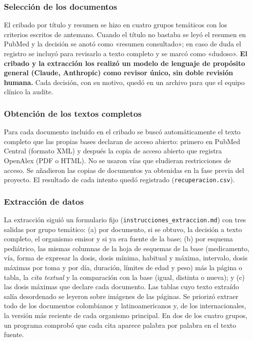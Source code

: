 \documentclass[11pt,a4paper]{article}
\newcommand{\codigo}[1]{\texttt{\small #1}}
\begin{document}
\subsubsection{Selección de los documentos}

El cribado por título y resumen se hizo en cuatro grupos temáticos con los criterios escritos de antemano. Cuando el título no bastaba se leyó el resumen en PubMed y la decisión se anotó como «resumen consultado»; en caso de duda el registro se incluyó para revisarlo a texto completo y se marcó como «dudoso». \textbf{El cribado y la extracción los realizó un modelo de lenguaje de propósito general (Claude, Anthropic) como revisor único, sin doble revisión humana.} Cada decisión, con su motivo, quedó en un archivo para que el equipo clínico la audite.

\subsubsection{Obtención de los textos completos}

Para cada documento incluido en el cribado se buscó automáticamente el texto completo que las propias bases declaran de acceso abierto: primero en PubMed Central (formato XML) y después la copia de acceso abierto que registra OpenAlex (PDF o HTML). No se usaron vías que eludieran restricciones de acceso. Se añadieron las copias de documentos ya obtenidas en la fase previa del proyecto. El resultado de cada intento quedó registrado (\codigo{recuperacion.csv}).

\subsubsection{Extracción de datos}

La extracción siguió un formulario fijo (\codigo{instrucciones\_extraccion.md}) con tres salidas por grupo temático: (a) por documento, si se obtuvo, la decisión a texto completo, el organismo emisor y si ya era fuente de la base; (b) por esquema pediátrico, las mismas columnas de la hoja de esquemas de la base (medicamento, vía, forma de expresar la dosis, dosis mínima, habitual y máxima, intervalo, dosis máximas por toma y por día, duración, límites de edad y peso) más la página o tabla, la \emph{cita textual} y la comparación con la base (igual, distinta o nueva); y (c) las dosis máximas que declare cada documento. Las tablas cuyo texto extraído salía desordenado se leyeron sobre imágenes de las páginas. Se priorizó extraer todo de los documentos colombianos y latinoamericanos y, de los internacionales, la versión más reciente de cada organismo principal. En dos de los cuatro grupos, un programa comprobó que cada cita aparece palabra por palabra en el texto fuente.
\end{document}
